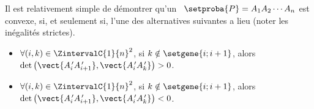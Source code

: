 \begin{remark}
    Il est relativement simple de démontrer qu'un \ngone\ $\setproba{P} = A_1 A_2 \cdots A_n$ est convexe, si, et seulement si, l'une des alternatives suivantes a lieu (noter les inégalités strictes).
	\begin{itemize}
		\item $\forall (i, k) \in \ZintervalC{1}{n}^2$,
		si $k \notin \setgene{i ; i+1}$, alors
		$\det \big( \vect{\primeit{A}_i \primeit{A}_{i+1}}, \vect{\primeit{A}_i \primeit{A}_k} \big) > 0$.

		\item $\forall (i, k) \in \ZintervalC{1}{n}^2$,
		si $k \notin \setgene{i ; i+1}$, alors
		$\det \big( \vect{\primeit{A}_i \primeit{A}_{i+1}}, \vect{\primeit{A}_i \primeit{A}_k} \big) < 0$.
    \end{itemize}
\end{remark}




